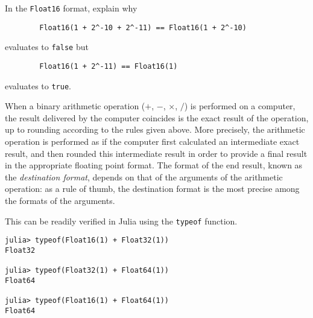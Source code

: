 \begin{exercise}
    In the \texttt{Float16} format, explain why
    \begin{verbatim}
        Float16(1 + 2^-10 + 2^-11) == Float16(1 + 2^-10)
    \end{verbatim}
    evaluates to \texttt{false}
    but
    \begin{verbatim}
        Float16(1 + 2^-11) == Float16(1)
    \end{verbatim}
    evaluates to \texttt{true}.
\end{exercise}

When a binary arithmetic operation ($+$, $-$, $\times$, $/$) is performed on a computer,
the result delivered by the computer coincides is the exact result of the operation,
up to rounding according to the rules given above.
More precisely,
the arithmetic operation is performed as if the computer first calculated an intermediate exact result,
and then rounded this intermediate result in order to provide a final result in the appropriate floating point format.
The format of the end result,
known as the \emph{destination format},
depends on that of the arguments of the arithmetic operation:
as a rule of thumb,
the destination format is the most precise among the formats of the arguments.
\begin{example}
This can be readily verified in Julia using the \texttt{typeof} function.
\begin{verbatim}
julia> typeof(Float16(1) + Float32(1))
Float32

julia> typeof(Float32(1) + Float64(1))
Float64

julia> typeof(Float16(1) + Float64(1))
Float64
\end{verbatim}
\end{example}

